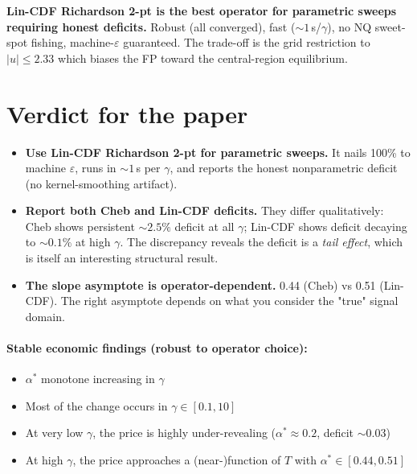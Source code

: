 \documentclass[11pt]{article}
\begin{document}
\textbf{Lin-CDF Richardson 2-pt is the best operator for parametric
sweeps requiring honest deficits.} Robust (all converged), fast
($\sim 1$\,s/$\gamma$), no NQ sweet-spot fishing, machine-$\varepsilon$
guaranteed. The trade-off is the grid restriction to $|u|\!\leq\!2.33$
which biases the FP toward the central-region equilibrium.

\section{Verdict for the paper}

\begin{itemize}
  \item \textbf{Use Lin-CDF Richardson 2-pt for parametric sweeps.}
        It nails 100\% to machine $\varepsilon$, runs in $\sim 1$\,s
        per $\gamma$, and reports the honest nonparametric deficit
        (no kernel-smoothing artifact).
  \item \textbf{Report both Cheb and Lin-CDF deficits.} They differ
        qualitatively: Cheb shows persistent $\sim 2.5\%$ deficit at
        all $\gamma$; Lin-CDF shows deficit decaying to $\sim 0.1\%$
        at high $\gamma$. The discrepancy reveals the deficit is a
        \emph{tail effect}, which is itself an interesting structural
        result.
  \item \textbf{The slope asymptote is operator-dependent.} 0.44 (Cheb)
        vs 0.51 (Lin-CDF). The right asymptote depends on what you
        consider the "true" signal domain.
\end{itemize}

\paragraph{Stable economic findings (robust to operator choice):}
\begin{itemize}
  \item $\alpha^*$ monotone increasing in $\gamma$
  \item Most of the change occurs in $\gamma \in [0.1, 10]$
  \item At very low $\gamma$, the price is highly under-revealing
        ($\alpha^* \approx 0.2$, deficit $\sim 0.03$)
  \item At high $\gamma$, the price approaches a (near-)function of
        $T$ with $\alpha^* \in [0.44, 0.51]$
\end{itemize}
\end{document}
